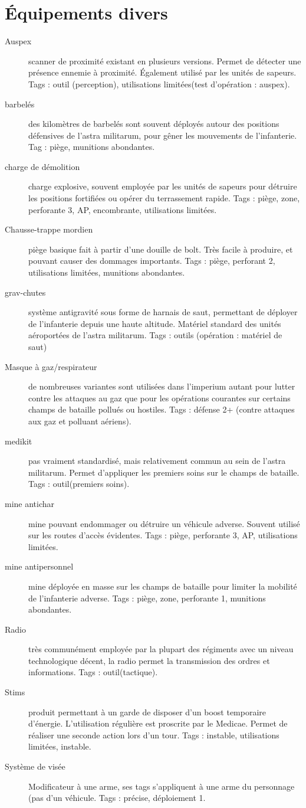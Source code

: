 \documentclass[10pt,a4paper]{article}
\begin{document}
\section{Équipements divers}
\begin{description}
\item[Auspex]scanner de proximité existant en plusieurs versions. Permet de détecter une présence ennemie à proximité. Également utilisé par les unités de sapeurs. Tags : outil (perception), utilisations limitées(test d'opération : auspex).
\item[barbelés] des kilomètres de barbelés sont souvent déployés autour des positions défensives de l'astra militarum, pour gêner les mouvements de l'infanterie. Tag : piège, munitions abondantes.
\item[charge de démolition] charge explosive, souvent employée par les unités de sapeurs pour détruire les positions fortifiées ou opérer du terrassement rapide. Tags : piège, zone, perforante 3, AP, encombrante, utilisations limitées. 
\item[Chausse-trappe mordien] piège basique fait à partir d'une douille de bolt. Très facile à produire, et pouvant causer des dommages importants. Tags : piège, perforant 2, utilisations limitées, munitions abondantes.
\item[grav-chutes]système antigravité sous forme de harnais de saut, permettant de déployer de l'infanterie depuis une haute altitude. Matériel standard des unités aéroportées de l'astra militarum. Tags : outils (opération : matériel de saut)
\item[Masque à gaz/respirateur] de nombreuses variantes sont utilisées dans l'imperium autant pour lutter contre les attaques au gaz que pour les opérations courantes sur certains champs de bataille pollués ou hostiles. Tags : défense 2+ (contre attaques aux gaz et polluant aériens).
\item[medikit] pas vraiment standardisé, mais relativement commun au sein de l'astra militarum. Permet d'appliquer les premiers soins sur le champs de bataille. Tags : outil(premiers soins).
\item[mine antichar] mine pouvant endommager ou détruire un véhicule adverse. Souvent utilisé sur les routes d'accès évidentes. Tags : piège, perforante 3, AP, utilisations limitées.
\item[mine antipersonnel] mine déployée en masse sur les champs de bataille pour limiter la mobilité de l'infanterie adverse. Tags : piège, zone, perforante 1, munitions abondantes.
\item[Radio] très communément employée par la plupart des régiments avec un niveau technologique décent, la radio permet la transmission des ordres et informations. Tags : outil(tactique).
\item[Stims] produit permettant à un garde de disposer d'un boost temporaire d'énergie. L'utilisation régulière est proscrite par le Medicae. Permet de réaliser une seconde action lors d'un tour. Tags : instable, utilisations limitées, instable.
\item[Système de visée]Modificateur à une arme, ses tags s'appliquent à une arme du personnage (pas d'un véhicule. Tags : précise, déploiement 1.
\end{description}
\end{document}
